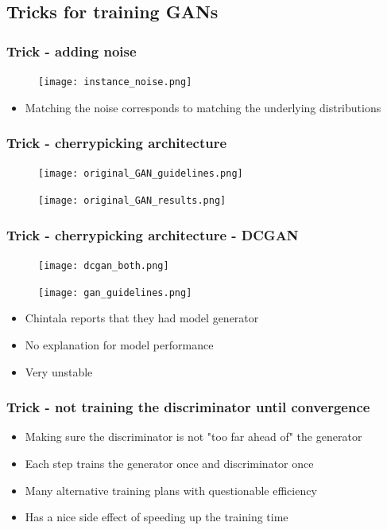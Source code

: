\documentclass{Bredelebeamer}
\begin{document}
\subsection{Tricks for training GANs}
\begin{frame}
	\frametitle{Trick - adding noise}
	\begin{figure}[h!]
		\centering
		\texttt{[image: instance\_noise.png]}
	\end{figure}
	\begin{itemize}
		\item Matching the noise corresponds to matching the underlying distributions
	\end{itemize}
\end{frame}
\begin{frame}
	\frametitle{Trick - cherrypicking architecture}
		\begin{figure}[h!]
			\centering
			\texttt{[image: original\_GAN\_guidelines.png]}
		\end{figure}
		\pause
		\begin{figure}[h!]
			\centering
			\texttt{[image: original\_GAN\_results.png]}
		\end{figure}
\end{frame}
\begin{frame}
	\frametitle{Trick - cherrypicking architecture - DCGAN}
	\begin{figure}[h!]
		\centering
		\texttt{[image: dcgan\_both.png]}
	\end{figure}
	\pause
	\begin{figure}[h!]
		\centering
		\texttt{[image: gan\_guidelines.png]}
	\end{figure}
	\pause
	\begin{itemize}[<+(1)->]
		\item Chintala reports that they had model generator \footnotemark
		\item No explanation for model performance
		\item Very unstable
	\end{itemize}
\end{frame}
\begin{frame}
	\frametitle{Trick - not training the discriminator until convergence}
	\begin{itemize}[<+->]
		\item Making sure the discriminator is not "too far ahead of" the generator
		\item Each step trains the generator once and discriminator once
		\item Many alternative training plans with questionable efficiency
		\item Has a nice side effect of speeding up the training time
	\end{itemize}
\end{frame}
\end{document}
